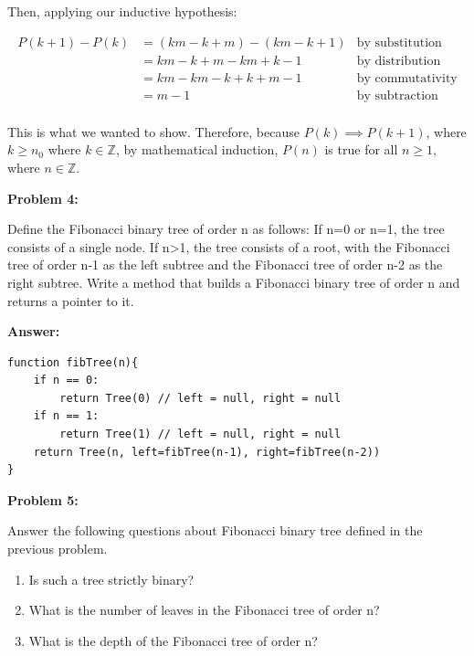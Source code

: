 \documentclass[10pt,letterpaper,final]{report}
\begin{document}
Then, applying our inductive hypothesis:

\begin{align*}
  P(k+1) - P(k) & = (km - k + m) - (km - k + 1) & \text{by substitution}  \\
                & = km - k + m - km + k - 1     & \text{by distribution}  \\
                & = km - km - k + k + m - 1     & \text{by commutativity} \\
                & = m - 1                       & \text{by subtraction}   \\
\end{align*}

This is what we wanted to show. Therefore, because $P(k) \implies P(k+1)$, where $k \ge n_0$ where $k \in \mathbb{Z}$, by mathematical induction, $P(n)$ is true for all $n \ge 1$, where $n \in \mathbb{Z}$.

\medskip
\noindent\textbf{Problem 4:}
\medskip

Define the Fibonacci binary tree of order n as follows: If n=0 or n=1, the tree consists of a single node. If n>1, the tree consists of a root, with the Fibonacci tree of order n-1 as the left subtree and the Fibonacci tree of order n-2 as the right subtree. Write a method that builds a Fibonacci binary tree of order n and returns a pointer to it.

\medskip
\noindent\textbf{Answer:}
\medskip

\begin{verbatim}
function fibTree(n){
    if n == 0:
        return Tree(0) // left = null, right = null
    if n == 1:
        return Tree(1) // left = null, right = null
    return Tree(n, left=fibTree(n-1), right=fibTree(n-2))
}
\end{verbatim}


\medskip
\noindent\textbf{Problem 5:}
\medskip

Answer the following questions about Fibonacci binary tree defined in the previous problem.

\begin{enumerate}
  \item Is such a tree strictly binary?
  \item What is the number of leaves in the Fibonacci tree of order n?
  \item What is the depth of the Fibonacci tree of order n?
\end{enumerate}
\end{document}
